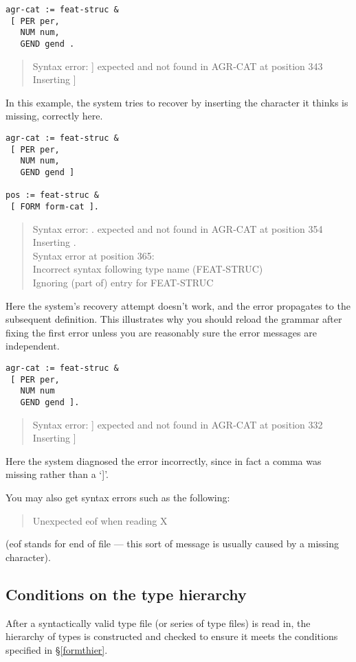 \documentclass[12pt]{report}
\newenvironment{error}%
{\begin{quote}
\tt
}%
{\end{quote}
}
\begin{document}
\begin{verbatim}
agr-cat := feat-struc &
 [ PER per,
   NUM num,
   GEND gend .
\end{verbatim}
\begin{error}
Syntax error: ] expected and not found in AGR-CAT at position 343\\
Inserting ]
\end{error}
In this example, the system tries to recover by inserting the character
it thinks is missing, correctly here.

\begin{verbatim}
agr-cat := feat-struc &
 [ PER per,
   NUM num,
   GEND gend ] 

pos := feat-struc &
 [ FORM form-cat ].

\end{verbatim}
\begin{error}
Syntax error: . expected and not found in AGR-CAT at position 354\\
Inserting .\\
Syntax error at position 365:\\ 
Incorrect syntax following type name (FEAT-STRUC)\\
Ignoring (part of) entry for FEAT-STRUC
\end{error}
Here the system's recovery attempt doesn't work, and the error 
propagates to the subsequent definition.  This illustrates
why you should reload the grammar after fixing the first error
unless you are reasonably sure the error messages are independent.

\begin{verbatim}
agr-cat := feat-struc &
 [ PER per,
   NUM num
   GEND gend ]. 
\end{verbatim}
\begin{error}
Syntax error: ] expected and not found in AGR-CAT at position 332\\
Inserting ]
\end{error}
Here the system diagnosed the error incorrectly, since in fact
a comma was missing rather than a `]'.  

You may also get syntax errors such as the following:
\begin{error}
Unexpected eof when reading X
\end{error}
(eof stands for end of file --- this sort of message is usually 
caused by a missing character).

\subsection{Conditions on the type hierarchy}
After a syntactically valid type file (or series of type files)
is read in, the hierarchy of types is constructed and checked 
to ensure it meets the conditions specified in \S\ref{formthier}.
\end{document}
